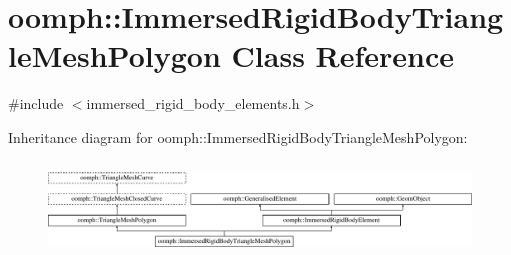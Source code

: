 \hypertarget{classoomph_1_1ImmersedRigidBodyTriangleMeshPolygon}{}\section{oomph\+:\+:Immersed\+Rigid\+Body\+Triangle\+Mesh\+Polygon Class Reference}
\label{classoomph_1_1ImmersedRigidBodyTriangleMeshPolygon}


{\ttfamily \#include $<$immersed\+\_\+rigid\+\_\+body\+\_\+elements.\+h$>$}

Inheritance diagram for oomph\+:\+:Immersed\+Rigid\+Body\+Triangle\+Mesh\+Polygon\+:\begin{figure}[H]
\begin{center}
\leavevmode
\includegraphics[height=2.522522cm]{classoomph_1_1ImmersedRigidBodyTriangleMeshPolygon}
\end{center}
\end{figure}
